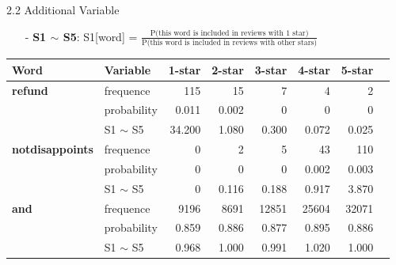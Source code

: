 \documentclass[10pt]{beamer}
\begin{document}
\begin{frame}{2.2 Additional Variable}

\begin{itemize}
\item[-] \textbf{S1 $\sim$ S5}: S1[word] = $\frac{\text{P(this word is included in reviews with 1 star)}}{\text{P(this word is included in reviews with other stars)}}$
\end{itemize}

\begin{table}[ht]

\centering %
\begin{tabular}{l l r r r r r r} %
	\hline %
	Word   &Variable  & 1-star & 2-star & 3-star & 4-star & 5-star  \\ [0.5ex] %
	\hline %
	\textbf{refund}         & frequence   & 115    & 15     & 7      & 4      & 2      \\
	& probability & 0.011  & 0.002  & 0      & 0      & 0      \\
	& S1 $\sim$ S5     & 34.200 & 1.080  & 0.300  & 0.072  & 0.025  \\
	\hline
	\textbf{notdisappoints} & frequence   & 0      & 2      & 5      & 43     & 110   \\
	& probability & 0      & 0      & 0      & 0.002  & 0.003  \\
	& S1 $\sim$ S5     & 0      & 0.116  & 0.188  & 0.917  & 3.870  \\
	\hline
	\textbf{and}            & frequence   & 9196   & 8691   & 12851  & 25604  & 32071  \\
	& probability & 0.859  & 0.886  & 0.877  & 0.895  & 0.886  \\
	& S1 $\sim$ S5     & 0.968  & 1.000  & 0.991  & 1.020  & 1.000  \\
	
	\hline %
\end{tabular}
\label{table:nonlin} %
\end{table}

\end{frame}
\end{document}
